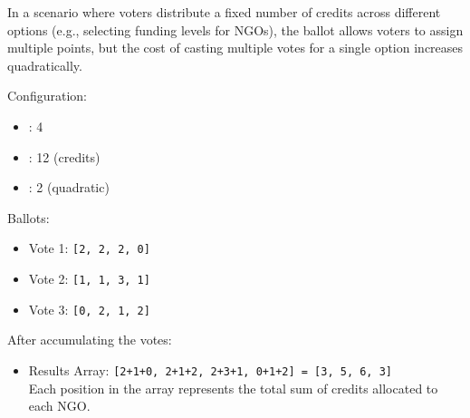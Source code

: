 In a scenario where voters distribute a fixed number of credits across different options (e.g., selecting funding levels for NGOs), the ballot allows voters to assign multiple points, but the cost of casting multiple votes for a single option increases quadratically.

Configuration:

\begin{itemize}
	\item \maxcount: 4
	\item \maxtotalcost: 12 (credits)
	\item \costexponent: 2 (quadratic)
\end{itemize}

Ballots:

\begin{itemize}
	\item Vote 1: \texttt{[2, 2, 2, 0]}
	\item Vote 2: \texttt{[1, 1, 3, 1]}
	\item Vote 3: \texttt{[0, 2, 1, 2]}
\end{itemize}



After accumulating the votes:


\begin{itemize}
	\item Results Array: \texttt{[2+1+0, 2+1+2, 2+3+1, 0+1+2] = [3, 5, 6, 3]} \\
	Each position in the array represents the total sum of credits allocated to each NGO.
\end{itemize}

